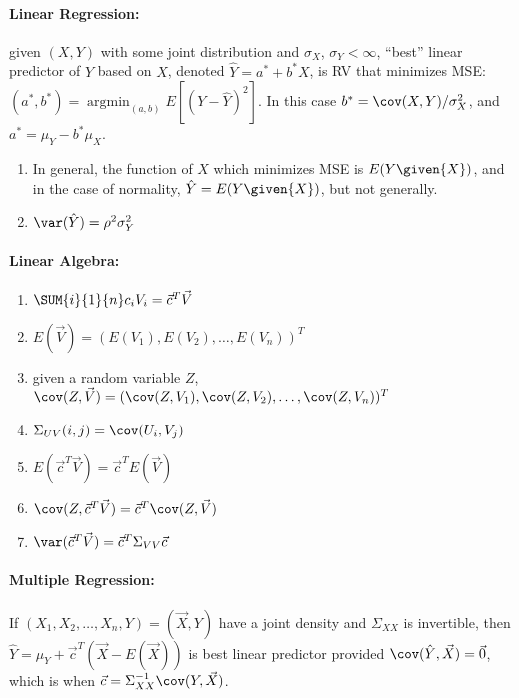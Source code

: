 \documentclass[10pt]{article}
\DeclareMathOperator{\argmin}{argmin}
\begin{document}
\begin{multicols}{2}
\paragraph{Linear Regression:} given $(X,Y)$ with some joint distribution and $\sigma_X$, $\sigma_{Y} < \infty$, ``best'' linear predictor of $Y$ based on $X$, denoted $\hat{Y} = a^{*} + b^{*}X$, is RV that minimizes MSE: $(a^{*},b^{*}) = \argmin_{(a,b)} E\left[(Y-\hat{Y})^2\right]$. In this case $b^{*} = \cov(X,Y)/\sigma_{X}^2$, and $a^{*} = \mu_{Y} - b^{*}\mu_{X}$. 
\begin{enumerate}
\item In general, the function of $X$ which minimizes MSE is $E(Y\given{X})$, and in the case of normality, $\hat{Y} = E(Y\given{X})$, but not generally. 
\item $\var(\hat{Y}) = \rho^2 \sigma_{Y}^2$
\end{enumerate}
\paragraph{Linear Algebra:}
\begin{enumerate}
\item $\SUM{i}{1}{n} c_i V_i = \vec{c}^{T} \vec{V}$
\item $E(\vec{V}) = (E(V_1), E(V_2), \ldots, E(V_n))^{T}$
\item given a random variable $Z$, $\cov(Z, \vec{V}) = (\cov(Z,V_1), \cov(Z,V_2), \ldots, \cov(Z,V_n))^{T}$
\item $\Sigma_{UV}(i,j) = \cov(U_i,V_j)$
\item $E(\vec{c}^{T} \vec{V}) = \vec{c}^{T} E(\vec{V})$ 
\item $\cov(Z, \vec{c}^{T} \vec{V}) = \vec{c}^{T} \cov(Z,\vec{V})$
\item $\var(\vec{c}^{T}\vec{V}) = \vec{c}^{T}\Sigma_{VV} \vec{c}$
\end{enumerate}

\paragraph{Multiple Regression:} If $(X_1,X_2,\ldots, X_n, Y) = (\vec{X},Y)$ have a joint density and $\Sigma_{XX}$ is invertible, then $\hat{Y} = \mu_{Y} + \vec{c}^{T}(\vec{X}-E(\vec{X}))$ is best linear predictor provided $\cov(\hat{Y},\vec{X}) = \vec{0}$, which is when $\vec{c} = \Sigma_{XX}^{-1}\cov(Y,\vec{X})$. 
\end{multicols}
\end{document}

